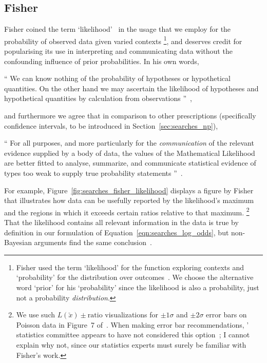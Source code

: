 \subsection{Fisher}
\label{sec:searches_fisher}
Fisher coined the term `likelihood'~\cite{
fisher1912fitting,
fisher1915frequency,
fisher1921probable,
fisher1922estimators
} in the usage that
we employ for the probability of observed data given varied
contexts%
\footnote{%
Fisher used the term `likelihood' for the function exploring
contexts and `probability' for the distribution over
outcomes~\cite{fisher1925smrw}.
We choose the alternative word `prior' for his `probability' since the
likelihood is also a probability, just not a probability \emph{distribution}.
},
and deserves credit for popularising its use in interpreting and communicating
data without the confounding influence of prior probabilities.
In his own words,%
\begin{displayquote}
\small
``%
We can know nothing of the probability of hypotheses or hypothetical
quantities.
On the other hand we may ascertain the likelihood of hypotheses
and hypothetical quantities by calculation from observations%
''~\cite{fisher1921probable},
\end{displayquote}
and furthermore we agree that in comparison to other prescriptions
(specifically confidence intervals, to be introduced in
Section~\ref{sec:searches_np}),
\begin{displayquote}
\small
``%
For all purposes, and more particularly for the \textit{communication} of the
relevant evidence supplied by a body of data, the values of the Mathematical
Likelihood are better fitted to analyse, summarize, and communicate
statistical evidence of types too weak to supply true probability statements%
''~\cite{fisher1956statistical}.
\end{displayquote}
For example, Figure~\ref{fig:searches_fisher_likelihood} displays a figure by
Fisher~\cite{fisher1956statistical} that illustrates how data can be usefully
reported by the likelihood's maximum and the regions in which it exceeds
certain ratios relative to that maximum.%
\footnote{%
We use such $L(\check{x})\pm\mathrm{ratio}$ visualizations for
$\pm1\sigma$ and $\pm2\sigma$ error bars on Poisson data in
Figure~7 of~\cite{lester2022hunting}.
When making error bar recommendations, \atlas' statistics committee appears
to have not considered this option~\cite{cowan2011errorbars};
I cannot explain why not, since our statistics experts must surely be familiar
with Fisher's work.
}
That the likelihood contains all relevant information in the data is true by
definition in our formulation of Equation~\ref{eqn:searches_log_odds},
but non-Bayesian arguments find the same conclusion~\cite{
birnbaum1962foundations,
savage1962foundations
}.

